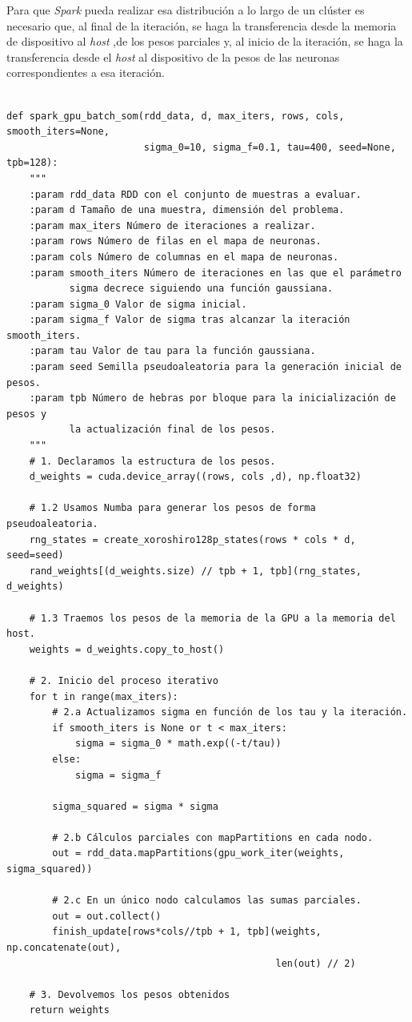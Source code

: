 Para que \textit{Spark} pueda realizar esa distribución a lo largo de un clúster es necesario que, al final de la iteración, se haga la transferencia desde la memoria de dispositivo al \textit{host} ,de los pesos parciales y, al inicio de la iteración, se haga la transferencia desde el \textit{host} al dispositivo de la pesos de las neuronas correspondientes a esa iteración.\\

\begin{code}
\begin{verbatim}

def spark_gpu_batch_som(rdd_data, d, max_iters, rows, cols, smooth_iters=None,
                        sigma_0=10, sigma_f=0.1, tau=400, seed=None, tpb=128):
    """
    :param rdd_data RDD con el conjunto de muestras a evaluar.
    :param d Tamaño de una muestra, dimensión del problema.
    :param max_iters Número de iteraciones a realizar.
    :param rows Número de filas en el mapa de neuronas.
    :param cols Número de columnas en el mapa de neuronas.
    :param smooth_iters Número de iteraciones en las que el parámetro
           sigma decrece siguiendo una función gaussiana. 
    :param sigma_0 Valor de sigma inicial.
    :param sigma_f Valor de sigma tras alcanzar la iteración smooth_iters.
    :param tau Valor de tau para la función gaussiana.
    :param seed Semilla pseudoaleatoria para la generación inicial de pesos.
    :param tpb Número de hebras por bloque para la inicialización de pesos y
           la actualización final de los pesos.
    """
    # 1. Declaramos la estructura de los pesos.
    d_weights = cuda.device_array((rows, cols ,d), np.float32)

    # 1.2 Usamos Numba para generar los pesos de forma pseudoaleatoria.
    rng_states = create_xoroshiro128p_states(rows * cols * d, seed=seed)
    rand_weights[(d_weights.size) // tpb + 1, tpb](rng_states, d_weights)
     
    # 1.3 Traemos los pesos de la memoria de la GPU a la memoria del host.
    weights = d_weights.copy_to_host()

    # 2. Inicio del proceso iterativo
    for t in range(max_iters):
        # 2.a Actualizamos sigma en función de los tau y la iteración.
        if smooth_iters is None or t < max_iters:
            sigma = sigma_0 * math.exp((-t/tau))
        else:
            sigma = sigma_f
            
        sigma_squared = sigma * sigma
        
        # 2.b Cálculos parciales con mapPartitions en cada nodo.
        out = rdd_data.mapPartitions(gpu_work_iter(weights, sigma_squared))
        
        # 2.c En un único nodo calculamos las sumas parciales.
        out = out.collect()
        finish_update[rows*cols//tpb + 1, tpb](weights, np.concatenate(out), 
                                               len(out) // 2)
       
    # 3. Devolvemos los pesos obtenidos
    return weights
\end{verbatim}
\label{code:somspark}
\end{code}

